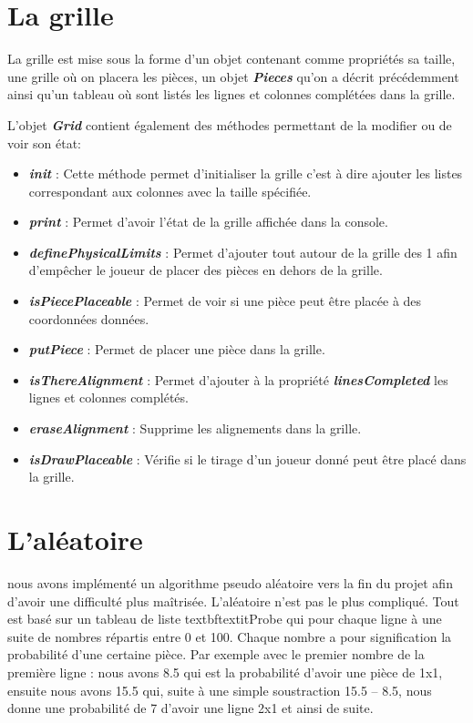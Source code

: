 \documentclass[a4paper]{report}
\begin{document}
\section{La grille}
La grille est mise sous la forme d'un objet contenant comme propriétés sa taille, une grille où on placera les pièces, un objet \textbf{\textit{Pieces}} qu'on a décrit précédemment ainsi qu'un tableau où sont listés les lignes et colonnes complétées dans la grille.

L'objet \textbf{\textit{Grid}} contient également des méthodes permettant de la modifier ou de voir son état:
\begin{itemize}
	\item \textbf{\textit{init}} : Cette méthode permet d'initialiser la grille c'est à dire ajouter les listes correspondant aux colonnes avec la taille spécifiée.
	\item \textbf{\textit{print}} : Permet d'avoir l'état de la grille affichée dans la console.
	\item \textbf{\textit{definePhysicalLimits}} : Permet d'ajouter tout autour de la grille des 1 afin d'empêcher le joueur de placer des pièces en dehors de la grille.
	\item \textbf{\textit{isPiecePlaceable}} : Permet de voir si une pièce peut être placée à des coordonnées données.
	\item \textbf{\textit{putPiece}} : Permet de placer une pièce dans la grille.
	\item \textbf{\textit{isThereAlignment}} : Permet d'ajouter à la propriété \textbf{\textit{linesCompleted}} les lignes et colonnes complétés.
	\item \textbf{\textit{eraseAlignment}} : Supprime les alignements dans la grille.
	\item \textbf{\textit{isDrawPlaceable}} : Vérifie si le tirage d'un joueur donné peut être placé dans la grille.
\end{itemize}

\section{L'aléatoire}
nous avons implémenté un algorithme pseudo aléatoire vers la fin du projet afin d'avoir une difficulté plus maîtrisée. L'aléatoire n'est pas le plus compliqué. Tout est basé sur un tableau de liste textbf{textit{Probe}} qui pour chaque ligne à une suite de nombres répartis entre 0 et 100. Chaque nombre a pour signification la probabilité d'une certaine pièce. Par exemple avec le premier nombre de la première ligne : nous avons 8.5 qui est la probabilité d'avoir une pièce de 1x1, ensuite nous avons 15.5 qui, suite à une simple soustraction 15.5 – 8.5, nous donne une probabilité de 7 d'avoir une ligne 2x1 et ainsi de suite.
\end{document}
